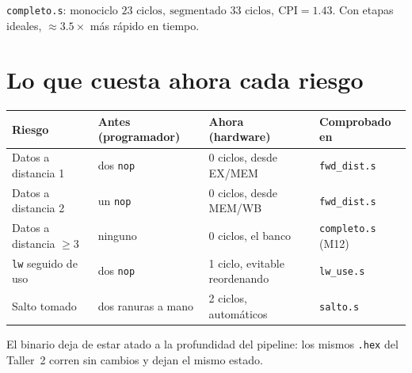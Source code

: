 \documentclass[11pt,letterpaper]{article}
\newcommand{\cod}[1]{\texttt{#1}}
\begin{document}
\begin{respuesta}[Resultado]
\cod{completo.s}: $\boxed{\text{monociclo } 23 \text{ ciclos},\ \text{segmentado } 33 \text{ ciclos},\
\mathrm{CPI} = \num{1.43}}$. Con etapas ideales, $\approx \num{3.5}\times$ m\'as r\'apido en tiempo.
\end{respuesta}

\section{Lo que cuesta ahora cada riesgo}
\begin{center}\small
\begin{tabular}{@{}l l l l@{}}
\toprule
\textbf{Riesgo} & \textbf{Antes (programador)} & \textbf{Ahora (hardware)} & \textbf{Comprobado en} \\
\midrule
Datos a distancia 1 & dos \cod{nop} & 0 ciclos, desde EX/MEM & \cod{fwd\_dist.s} \\
Datos a distancia 2 & un \cod{nop} & 0 ciclos, desde MEM/WB & \cod{fwd\_dist.s} \\
Datos a distancia $\geq 3$ & ninguno & 0 ciclos, el banco & \cod{completo.s} (M12) \\
\cod{lw} seguido de uso & dos \cod{nop} & 1 ciclo, evitable reordenando & \cod{lw\_use.s} \\
Salto tomado & dos ranuras a mano & 2 ciclos, autom\'aticos & \cod{salto.s} \\
\bottomrule
\end{tabular}
\end{center}
El binario deja de estar atado a la profundidad del pipeline: los mismos \cod{.hex} del Taller~2 corren
sin cambios y dejan el mismo estado.

\end{document}
